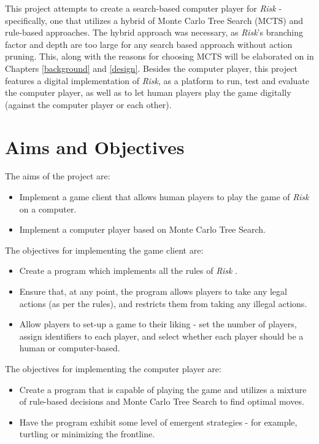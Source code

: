 This project attempts to create a search-based computer player for \textit{Risk} - specifically, one that utilizes a hybrid of Monte Carlo Tree Search (MCTS) \cite{Coulom2007MonteCarlo} and rule-based approaches. The hybrid approach was necessary, as \textit{Risk}'s branching factor and depth are too large for any search based approach without action pruning. This, along with the reasons for choosing MCTS will be elaborated on in Chapters \ref{background} and \ref{design}. Besides the computer player, this project features a digital implementation of \textit{Risk}, as a platform to run, test and evaluate the computer player, as well as to let human players play the game digitally (against the computer player or each other).

\section{Aims and Objectives}
\label{aimsAndObjectives}

The aims of the project are:
\begin{itemize}
\item Implement a game client that allows human players to play the game of \textit{Risk} on a computer.
\item Implement a computer player based on Monte Carlo Tree Search.
\end{itemize}
The objectives for implementing the game client are:
\begin{itemize}
\item Create a program which implements all the rules of \textit{Risk} \cite{riskrules}.
\item Ensure that, at any point, the program allows players to take any legal actions (as per the rules), and restricts them from taking any illegal actions.
\item Allow players to set-up a game to their liking - set the number of players, assign identifiers to each player, and select whether each player should be a human or computer-based.
\end{itemize}
The objectives for implementing the computer player are:
\begin{itemize}
\item Create a program that is capable of playing the game and utilizes a mixture of rule-based decisions and Monte Carlo Tree Search to find optimal moves.
\item Have the program exhibit some level of emergent strategies - for example, turtling or minimizing the frontline.
\end{itemize}

